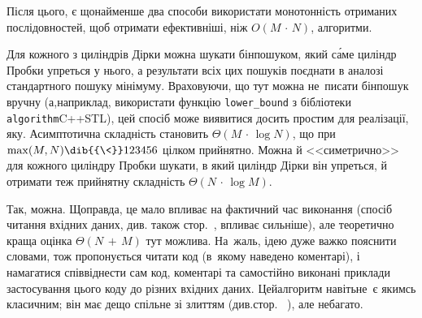 \vspace{0pt plus 5mm}

Після цього, є щонайменше два способи використати монотонність отриманих послідовностей, щоб отримати ефективніші, ніж ${O(M\,{\cdot}\,N)}$, алгоритми.

Для кожного з циліндрів Дірки можна шукати бінпошуком, який с\'{а}ме циліндр Пробки упреться у нього, а результати всіх цих пошуків поєднати в аналозі стандартного пошуку мінімуму.
%
Враховуючи, що тут можна не~писати бінпошук вручну (а,\nolinebreak[3] наприклад, використати функцію \verb"lower_bound" з бібліотеки \verb"algorithm"\nolinebreak[2] C++\nolinebreak[3] STL), цей спосіб може виявитися досить простим для реалізації, як\nolinebreak[2] у\nolinebreak[2] . Асимптотична складність становить ${\Theta(M\,{\cdot}\,\log{}N)}$, що при $\max(M,N)\dib{{\<}}123456$ 
цілком прийнятно.
Можна й <<симетрично>> для кожного циліндру Пробки шукати, в який циліндр Дірки він упреться, й отримати теж прийнятну складність ${\Theta(N\,{\cdot}\,\log{}M)}$.

Так, можна. Щоправда, це мало впливає на фактичний час виконання (спосіб читання вхід\-них даних, див. також стор.~\pageref{text:io-streams-versus-scanf-printf}, впливає сильніше), але теоретично краща оцінка ${\Theta(N\,{+}\,M)}$ тут можлива. На~жаль, ідею дуже важко пояснити словами, тож пропонується читати код  (в~якому наведено коментарі), і намагатися співвіднести сам код, коментарі та самостійно виконані приклади застосування цього коду до різних вхідних даних. Цей\nolinebreak[3] алгоритм навіть\nolinebreak[3] не~є якимсь класичним; він має дещо спільне зі злиттям (див.\nolinebreak[3] стор.~\pageref{text:about-merge-in-omnipresent-task}%
), але небагато.


\vspace{1pt plus 1in}

